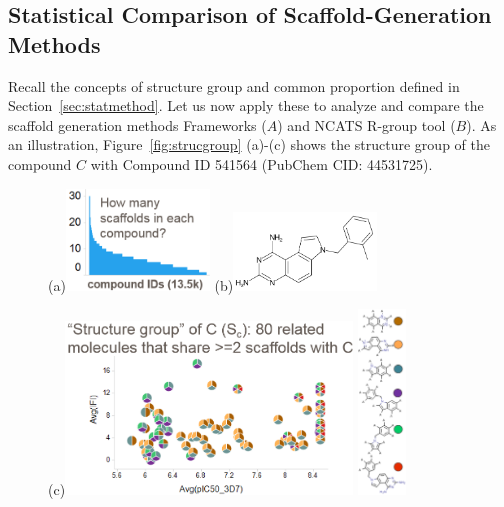 \documentclass[journal=jacsat,manuscript=article]{achemso}
\newcommand*\fref[1]{Figure~\ref{fig:#1}}
\newcommand*\sref[1]{Section~\ref{sec:#1}}
\begin{document}
\subsection{Statistical Comparison of Scaffold-Generation Methods}\label{sec:statcomp}

Recall the concepts of structure group and common proportion defined in \sref{statmethod}.  Let us now apply these to analyze and compare the scaffold generation methods Frameworks ($A$) and NCATS R-group tool ($B$). As an illustration, \fref{strucgroup} (a)-(c) shows the structure group of the compound $C$ with Compound ID 541564 (PubChem CID: 44531725). 
\begin{figure}
\centering
  \begin{minipage}[b][0.2\textheight][s]{0.3\textwidth}
  \centering
  (a)\includegraphics[width=1.5in]{fig/howmany_scaf.png}
  (b)\includegraphics[width=1.5in]{fig/tcam2_mol_541564.png}
  \end{minipage}
  (c)\includegraphics[width=3in]{fig/structure_group_C.png}
  \includegraphics[width=0.5in]{fig/tcam2_541564_6scaf_col.png}

\end{figure}
\end{document}
